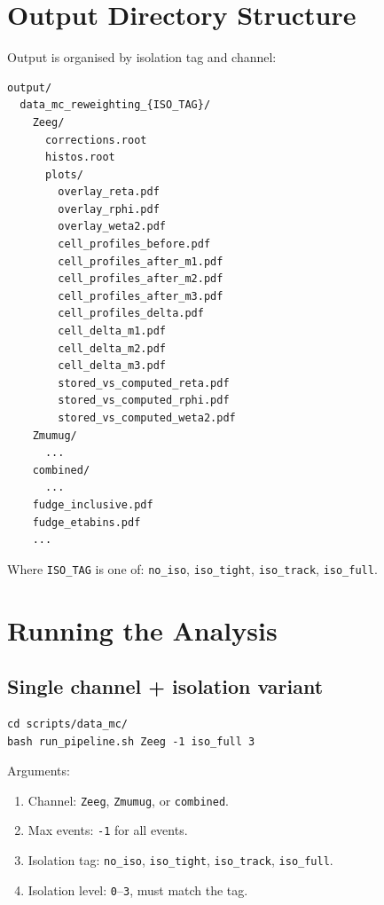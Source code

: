 \documentclass[12pt,a4paper]{article}
\begin{document}
\section{Output Directory Structure}
\label{sec:output}

Output is organised by isolation tag and channel:
\begin{lstlisting}
output/
  data_mc_reweighting_{ISO_TAG}/
    Zeeg/
      corrections.root
      histos.root
      plots/
        overlay_reta.pdf
        overlay_rphi.pdf
        overlay_weta2.pdf
        cell_profiles_before.pdf
        cell_profiles_after_m1.pdf
        cell_profiles_after_m2.pdf
        cell_profiles_after_m3.pdf
        cell_profiles_delta.pdf
        cell_delta_m1.pdf
        cell_delta_m2.pdf
        cell_delta_m3.pdf
        stored_vs_computed_reta.pdf
        stored_vs_computed_rphi.pdf
        stored_vs_computed_weta2.pdf
    Zmumug/
      ...
    combined/
      ...
    fudge_inclusive.pdf
    fudge_etabins.pdf
    ...
\end{lstlisting}

Where \texttt{ISO\_TAG} is one of: \texttt{no\_iso}, \texttt{iso\_tight},
\texttt{iso\_track}, \texttt{iso\_full}.

\section{Running the Analysis}
\label{sec:running}

\subsection{Single channel + isolation variant}

\begin{lstlisting}
cd scripts/data_mc/
bash run_pipeline.sh Zeeg -1 iso_full 3
\end{lstlisting}

Arguments:
\begin{enumerate}
  \item Channel: \texttt{Zeeg}, \texttt{Zmumug}, or \texttt{combined}.
  \item Max events: \texttt{-1} for all events.
  \item Isolation tag: \texttt{no\_iso}, \texttt{iso\_tight},
    \texttt{iso\_track}, \texttt{iso\_full}.
  \item Isolation level: \texttt{0}--\texttt{3}, must match the tag.
\end{enumerate}
\end{document}

